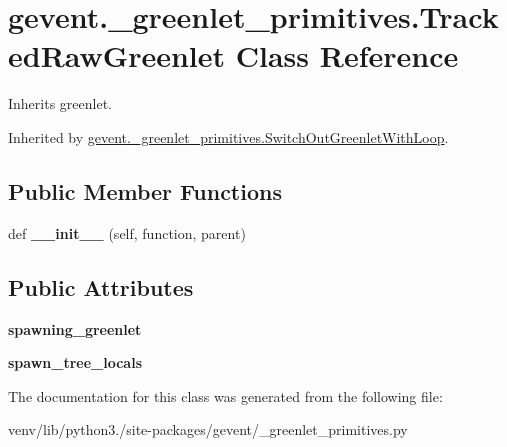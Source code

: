 \hypertarget{classgevent_1_1__greenlet__primitives_1_1_tracked_raw_greenlet}{}\section{gevent.\+\_\+greenlet\+\_\+primitives.\+Tracked\+Raw\+Greenlet Class Reference}
\label{classgevent_1_1__greenlet__primitives_1_1_tracked_raw_greenlet}


Inherits greenlet.



Inherited by \hyperlink{classgevent_1_1__greenlet__primitives_1_1_switch_out_greenlet_with_loop}{gevent.\+\_\+greenlet\+\_\+primitives.\+Switch\+Out\+Greenlet\+With\+Loop}.

\subsection*{Public Member Functions}
\begin{DoxyCompactItemize}
\item 
\mbox{\label{classgevent_1_1__greenlet__primitives_1_1_tracked_raw_greenlet_a9ea1a5e8f972385b0164b53927929db4}} 
def {\bfseries \+\_\+\+\_\+init\+\_\+\+\_\+} (self, function, parent)
\end{DoxyCompactItemize}
\subsection*{Public Attributes}
\begin{DoxyCompactItemize}
\item 
\mbox{\label{classgevent_1_1__greenlet__primitives_1_1_tracked_raw_greenlet_a1e10d835270e112ad97bd221097deed0}} 
{\bfseries spawning\+\_\+greenlet}
\item 
\mbox{\label{classgevent_1_1__greenlet__primitives_1_1_tracked_raw_greenlet_a4ba6a461cf524b30fcf4e47fa66fadec}} 
{\bfseries spawn\+\_\+tree\+\_\+locals}
\end{DoxyCompactItemize}


The documentation for this class was generated from the following file\+:\begin{DoxyCompactItemize}
\item 
venv/lib/python3./site-\/packages/gevent/\+\_\+greenlet\+\_\+primitives.\+py\end{DoxyCompactItemize}
